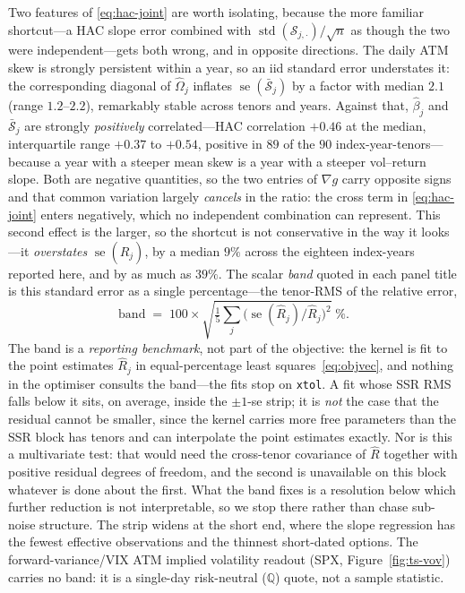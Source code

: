\documentclass[11pt]{article}
\providecommand{\1}{\mathbf 1}
\begin{document}
Two features of \eqref{eq:hac-joint} are worth isolating, because the more familiar
shortcut---a HAC slope error combined with $\operatorname{std}(\mathcal S_{j,\cdot})/\sqrt n$ as
though the two were independent---gets both wrong, and in opposite directions. The daily ATM skew is
strongly persistent within a year, so an iid standard error understates it: the corresponding
diagonal of $\widehat\Omega_j$ inflates $\operatorname{se}(\bar{\mathcal S}_j)$ by a factor with
median $2.1$ (range $1.2$--$2.2$), remarkably stable across tenors and years. Against that,
$\hat\beta_j$ and $\bar{\mathcal S}_j$ are strongly \emph{positively} correlated---HAC correlation
$+0.46$ at the median, interquartile range $+0.37$ to $+0.54$, positive in $89$ of the $90$
index-year-tenors---because a year with a steeper mean skew is a year with a steeper vol--return
slope. Both are negative quantities, so the two entries of $\nabla g$ carry opposite signs and that
common variation largely \emph{cancels} in the ratio: the cross term in \eqref{eq:hac-joint} enters
negatively, which no independent combination can represent. This second effect is the larger, so the
shortcut is not conservative in the way it looks---it \emph{overstates}
$\operatorname{se}(\widehat R_j)$, by a median $9\%$ across the eighteen index-years reported here,
and by as much as $39\%$.
The scalar \emph{band} quoted in each panel title is this standard error as a single
percentage---the tenor-RMS of the relative error,
\begin{equation}
  \mathrm{band} \;=\; 100\times\sqrt{\tfrac1{5}\textstyle\sum_{j}\big(\operatorname{se}(\widehat{R}_j)/\widehat{R}_j\big)^2}\;\%.
\end{equation}
The band is a \emph{reporting benchmark}, not part of the objective: the kernel is fit to the point
estimates $\widehat{R}_j$ in equal-percentage least squares~\eqref{eq:objvec}, and nothing in the
optimiser consults the band---the fits stop on \texttt{xtol}. A fit whose SSR RMS falls below it sits, on average, inside the $\pm1$-se strip; it is
\emph{not} the case that the residual cannot be smaller, since the kernel carries more free
parameters than the SSR block has tenors and can interpolate the point estimates exactly. Nor is
this a multivariate test: that would need the cross-tenor covariance of $\widehat R$ together with
positive residual degrees of freedom, and the second is unavailable on this block whatever is done
about the first. What the band fixes is a resolution below which further reduction is not
interpretable, so we stop there rather than chase sub-noise structure. The strip
widens at the short end, where the slope regression has the fewest effective observations and the thinnest
short-dated options. The forward-variance/VIX ATM implied volatility readout (SPX, Figure~\ref{fig:ts-vov}) carries no
band: it is a single-day risk-neutral ($\mathbb Q$) quote, not a sample statistic.
\end{document}
